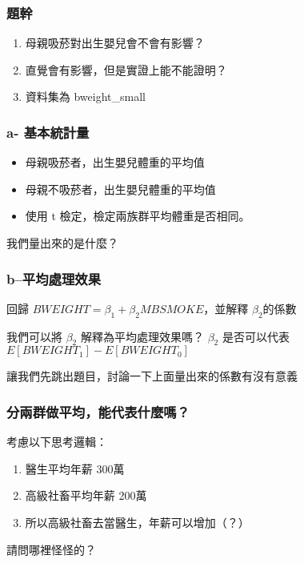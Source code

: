 \begin{frame}
    \frametitle{題幹}
    \begin{enumerate}[<+->]
        \item 母親吸菸對出生嬰兒會不會有影響？
        \item 直覺會有影響，但是實證上能不能證明？
        \item 資料集為 bweight\_small
    \end{enumerate}
\end{frame}

\begin{frame}
    \frametitle{ a- 基本統計量}
    \begin{itemize}
        \item 母親吸菸者，出生嬰兒體重的平均值
        \item 母親不吸菸者，出生嬰兒體重的平均值
        \item 使用 t 檢定，檢定兩族群平均體重是否相同。
    \end{itemize}
    我們量出來的是什麼？
\end{frame}
\begin{frame}
    \frametitle{b--平均處理效果}

    回歸 $BWEIGHT = \beta_1 + \beta_2 MBSMOKE$，並解釋 $\beta_2$的係數

    \begin{alertblock}{我們可以將 $\beta_2$ 解釋為平均處理效果嗎？}
        $\beta_2$ 是否可以代表 $E[BWEIGHT_1] - E[BWEIGHT_0]$
    \end{alertblock}
\end{frame}

\begin{frame}[plain]
    \begin{center}
        讓我們先跳出題目，討論一下上面量出來的係數有沒有意義
    \end{center}
\end{frame}


\begin{frame}
    \frametitle{分兩群做平均，能代表什麼嗎？}

    考慮以下思考邏輯：

    \begin{enumerate}
        \item 醫生平均年薪 300萬
        \item 高級社畜平均年薪 200萬
        \item 所以高級社畜去當醫生，年薪可以增加（？）
    \end{enumerate}
    \vfill
    \pause
    請問哪裡怪怪的？

\end{frame}

